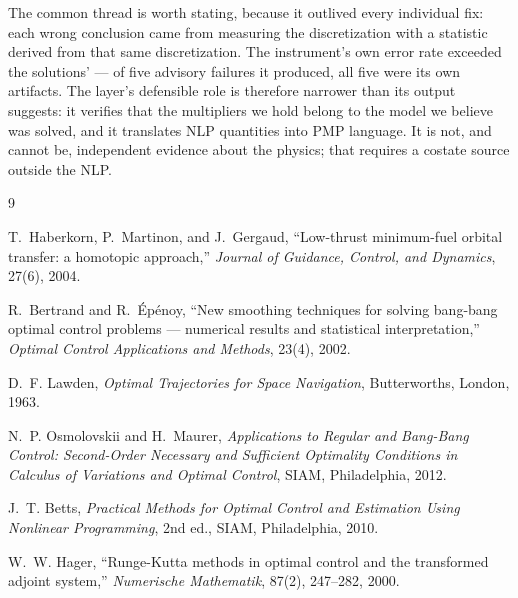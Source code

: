 \documentclass[11pt]{article}
\begin{document}
\noindent
The common thread is worth stating, because it outlived every individual fix:
each wrong conclusion came from measuring the discretization with a statistic
derived from that same discretization. The instrument's own error rate exceeded
the solutions' --- of five advisory failures it produced, all five were its own
artifacts. The layer's defensible role is therefore narrower than its output
suggests: it verifies that the multipliers we hold belong to the model we
believe was solved, and it translates NLP quantities into PMP language. It is
not, and cannot be, independent evidence about the physics; that requires a
costate source outside the NLP.

\begin{thebibliography}{9}

T.~Haberkorn, P.~Martinon, and J.~Gergaud,
``Low-thrust minimum-fuel orbital transfer: a homotopic approach,''
\emph{Journal of Guidance, Control, and Dynamics}, 27(6), 2004.

R.~Bertrand and R.~\'Ep\'enoy,
``New smoothing techniques for solving bang-bang optimal control problems ---
numerical results and statistical interpretation,''
\emph{Optimal Control Applications and Methods}, 23(4), 2002.

D.~F. Lawden,
\emph{Optimal Trajectories for Space Navigation},
Butterworths, London, 1963.

N.~P. Osmolovskii and H.~Maurer,
\emph{Applications to Regular and Bang-Bang Control: Second-Order Necessary
and Sufficient Optimality Conditions in Calculus of Variations and Optimal
Control}, SIAM, Philadelphia, 2012.

J.~T. Betts,
\emph{Practical Methods for Optimal Control and Estimation Using Nonlinear
Programming}, 2nd ed., SIAM, Philadelphia, 2010.

W.~W. Hager,
``Runge-Kutta methods in optimal control and the transformed adjoint
system,''
\emph{Numerische Mathematik}, 87(2), 247--282, 2000.

\end{thebibliography}
\end{document}
